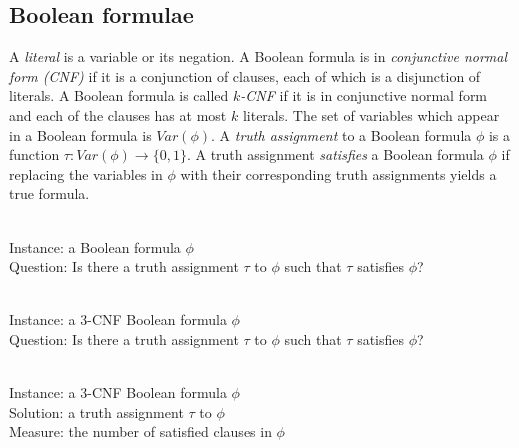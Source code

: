 \documentclass[]{article}
\newenvironment{instance}{\\Instance:}{}
\newenvironment{measure}{\\Measure:}{}
\newenvironment{solution}{\\Solution:}{}
\newenvironment{question}{\\Question:}{}
\begin{document}
\subsection{Boolean formulae}

A \emph{literal} is a variable or its negation.
A Boolean formula is in \emph{conjunctive normal form (CNF)} if it is a conjunction of clauses, each of which is a disjunction of literals.
A Boolean formula is called \emph{$k$-CNF} if it is in conjunctive normal form and each of the clauses has at most $k$ literals.
The set of variables which appear in a Boolean formula is $Var(\phi)$.
A \emph{truth assignment} to a Boolean formula $\phi$ is a function $\tau \colon Var(\phi) \to \{0, 1\}$.
A truth assignment \emph{satisfies} a Boolean formula $\phi$ if replacing the variables in $\phi$ with their corresponding truth assignments yields a true formula.

\begin{definition}
  \mbox{}
  \begin{instance}
    a Boolean formula $\phi$
  \end{instance}
  \begin{question}
    Is there a truth assignment $\tau$ to $\phi$ such that $\tau$ satisfies $\phi$?
  \end{question}
\end{definition}

\begin{definition}
  \mbox{}
  \begin{instance}
    a 3-CNF Boolean formula $\phi$
  \end{instance}
  \begin{question}
    Is there a truth assignment $\tau$ to $\phi$ such that $\tau$ satisfies $\phi$?
  \end{question}
\end{definition}

\begin{definition}
  \mbox{}
  \begin{instance}
    a 3-CNF Boolean formula $\phi$
  \end{instance}
  \begin{solution}
    a truth assignment $\tau$ to $\phi$
  \end{solution}
  \begin{measure}
    the number of satisfied clauses in $\phi$
  \end{measure}
\end{definition}
\end{document}
